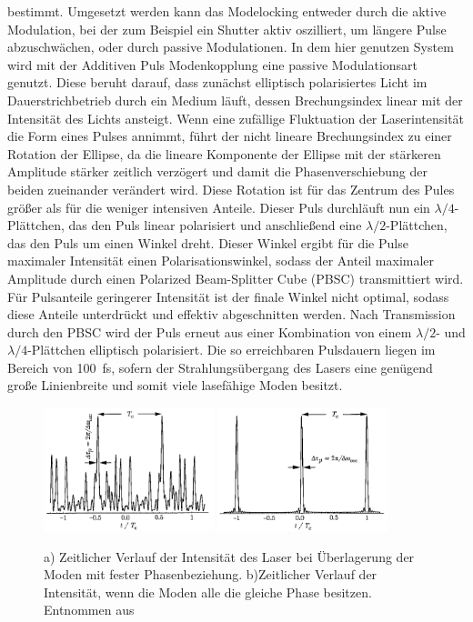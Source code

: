       bestimmt. 
      Umgesetzt werden kann das Modelocking entweder durch die aktive Modulation, bei der zum Beispiel ein Shutter aktiv oszilliert, um längere Pulse abzuschwächen, oder durch passive Modulationen. In dem hier 
      genutzen System wird mit der Additiven Puls Modenkopplung eine passive Modulationsart genutzt. Diese beruht darauf, dass zunächst elliptisch polarisiertes Licht im Dauerstrichbetrieb durch ein Medium 
      läuft, dessen Brechungsindex linear mit der Intensität des Lichts ansteigt. Wenn eine zufällige Fluktuation der Laserintensität die Form eines Pulses annimmt, führt der nicht lineare Brechungsindex 
      zu einer Rotation der Ellipse, da die lineare Komponente der Ellipse mit der stärkeren Amplitude stärker zeitlich verzögert und damit die Phasenverschiebung der beiden zueinander verändert wird. Diese
      Rotation ist für das Zentrum des Pules größer als für die weniger intensiven Anteile. Dieser Puls durchläuft nun ein $\lambda/4$-Plättchen, das den Puls linear polarisiert und anschließend eine  
      $\lambda/2$-Plättchen, das den Puls um einen Winkel dreht. Dieser Winkel ergibt für die Pulse maximaler Intensität einen Polarisationswinkel, sodass der Anteil maximaler Amplitude durch einen 
      Polarized Beam-Splitter Cube (PBSC) transmittiert wird. Für Pulsanteile geringerer Intensität ist der finale Winkel nicht optimal, sodass diese Anteile unterdrückt und effektiv abgeschnitten werden. Nach
      Transmission durch den PBSC wird der Puls erneut aus einer Kombination von einem $\lambda/2$- und $\lambda/4$-Plättchen elliptisch polarisiert. Die so erreichbaren Pulsdauern liegen im Bereich von 
      \SI{100}{\femto\second}, sofern der Strahlungsübergang des Lasers eine genügend große Linienbreite und somit viele lasefähige Moden besitzt. 

      \FloatBarrier
      \begin{figure}[h]
        \centering
        \includegraphics[width = 0.44\textwidth]{pictures/ML_phase_const.png}
        \includegraphics[width = 0.44\textwidth]{pictures/ML_phase_gleich.png}
        \caption{a) Zeitlicher Verlauf der Intensität des Laser bei Überlagerung der Moden mit fester Phasenbeziehung. b)Zeitlicher Verlauf der Intensität, wenn die Moden alle die gleiche Phase besitzen. Entnommen aus \cite{hooker_laser_2010}}
        \label{fig:Modelocking}
      \end{figure}
      \FloatBarrier
      
